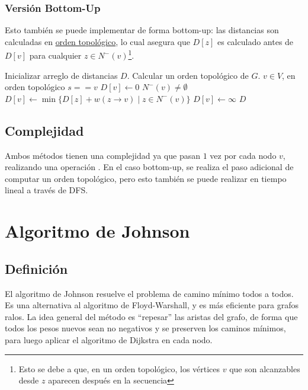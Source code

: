 \subsubsection{Versión Bottom-Up}

Esto también se puede implementar de forma bottom-up: las distancias son calculadas en \hyperref[orden-topologico]{orden topológico}, lo cual asegura que $D[z]$ es calculado antes de $D[v]$ para cualquier $z \in N^-(v)$\footnote{Esto se debe a que, en un orden topológico, los vértices $v$ que son alcanzables desde $z$ aparecen después en la secuencia}.

\begin{codebox}
    \li Inicializar arreglo de distancias $D$.
    \li Calcular un orden topológico de $G$.
    \li \For \Each $v \in V$, en orden topológico \Do
    \li \If $s == v$ \Then
    \li $D[v] \gets 0$
    \li \Else
    \li \If $N^-(v) \neq \emptyset$ \Then
    \li $D[v] \gets \min{\{D[z] + w(z \rightarrow v) \mid z \in N^-(v)\}}$
    \li \Else 
    \li $D[v] \gets \infty$
    \End
    \li \Return $D$
\end{codebox}

\subsection{Complejidad}

Ambos métodos tienen una complejidad  ya que pasan $1$ vez por cada nodo $v$, realizando una operación . En el caso bottom-up, se realiza el paso adicional de computar un orden topológico, pero esto también se puede realizar en tiempo lineal a través de DFS.

\section{Algoritmo de Johnson}

\subsection{Definición}

El algoritmo de Johnson resuelve el problema de camino mínimo todos a todos. Es una alternativa al algoritmo de Floyd-Warshall, y es más eficiente para grafos ralos. La idea general del método es ``repesar'' las aristas del grafo, de forma que todos los pesos nuevos sean no negativos y se preserven los caminos mínimos, para luego aplicar el algoritmo de Dijkstra en cada nodo.

